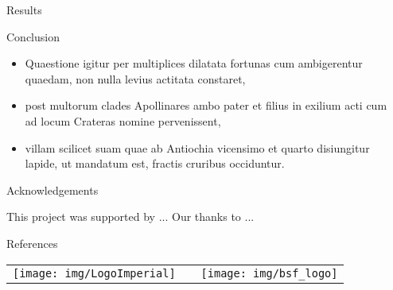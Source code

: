 \documentclass[final]{beamer}
\newlength{\sepwidth}
\newlength{\colwidth}
\newcommand{\separatorcolumn}{\begin{column}{\sepwidth}\end{column}}
\begin{document}
\begin{frame}[t]
\begin{columns}[t]
\begin{column}{\colwidth}
\begin{block}{Results}
\end{block}

\begin{block}{Conclusion}

\large

\begin{itemize}
    \item Quaestione igitur per multiplices dilatata fortunas cum ambigerentur quaedam, non nulla levius actitata constaret,
	\item post multorum clades Apollinares ambo pater et filius in exilium acti cum ad locum Crateras nomine pervenissent,
	\item villam scilicet suam quae ab Antiochia vicensimo et quarto disiungitur lapide, ut mandatum est, fractis cruribus occiduntur.
\end{itemize}

\end{block}

\begin{block}{Acknowledgements}

\footnotesize
This project was supported by ...
Our thanks to ...

\end{block}

\begin{block}{References}
  
%

\end{block}

\begin{block}

\begin{table}[]
    \centering
    \begin{tabular}{ccc}
         \texttt{[image: img/LogoImperial]} &
         \hspace{2cm} &
         \texttt{[image: img/bsf\_logo]} \\
    \end{tabular}
\end{table}

\end{block}

\end{column}

\separatorcolumn
\end{columns}

\end{frame}
\end{document}
